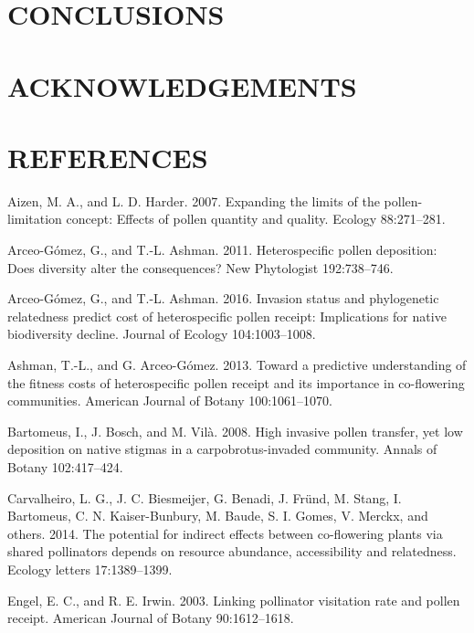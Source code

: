 \documentclass[11pt,a4paper]{article}
\begin{document}
\section{CONCLUSIONS}\label{conclusions}

\section{ACKNOWLEDGEMENTS}\label{acknowledgements}

\section{REFERENCES}\label{references}

\hypertarget{refs}{}
\hypertarget{ref-aizen2007}{}
Aizen, M. A., and L. D. Harder. 2007. Expanding the limits of the
pollen-limitation concept: Effects of pollen quantity and quality.
Ecology 88:271--281.

\hypertarget{ref-arceo2011}{}
Arceo-Gómez, G., and T.-L. Ashman. 2011. Heterospecific pollen
deposition: Does diversity alter the consequences? New Phytologist
192:738--746.

\hypertarget{ref-arceo2016}{}
Arceo-Gómez, G., and T.-L. Ashman. 2016. Invasion status and
phylogenetic relatedness predict cost of heterospecific pollen receipt:
Implications for native biodiversity decline. Journal of Ecology
104:1003--1008.

\hypertarget{ref-ashman2013}{}
Ashman, T.-L., and G. Arceo-Gómez. 2013. Toward a predictive
understanding of the fitness costs of heterospecific pollen receipt and
its importance in co-flowering communities. American Journal of Botany
100:1061--1070.

\hypertarget{ref-bartomeus2008}{}
Bartomeus, I., J. Bosch, and M. Vilà. 2008. High invasive pollen
transfer, yet low deposition on native stigmas in a carpobrotus-invaded
community. Annals of Botany 102:417--424.

\hypertarget{ref-carvalheiro2014}{}
Carvalheiro, L. G., J. C. Biesmeijer, G. Benadi, J. Fründ, M. Stang, I.
Bartomeus, C. N. Kaiser-Bunbury, M. Baude, S. I. Gomes, V. Merckx, and
others. 2014. The potential for indirect effects between co-flowering
plants via shared pollinators depends on resource abundance,
accessibility and relatedness. Ecology letters 17:1389--1399.

\hypertarget{ref-engel2003}{}
Engel, E. C., and R. E. Irwin. 2003. Linking pollinator visitation rate
and pollen receipt. American Journal of Botany 90:1612--1618.
\end{document}
